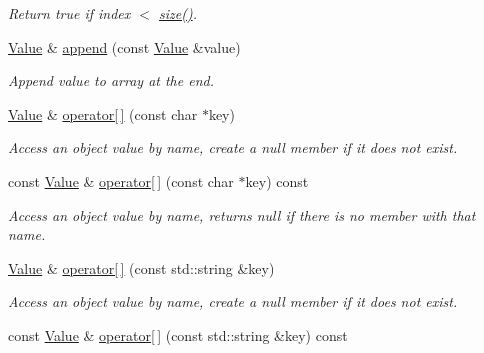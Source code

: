 \begin{DoxyCompactItemize}
\begin{DoxyCompactList}\small\item\em Return true if index $<$ \hyperlink{class_json_1_1_value_a4ca8ee6c48a34ca6c2f131956bab5e05}{size()}. \end{DoxyCompactList}\item 
\hyperlink{class_json_1_1_value}{Value} \& \hyperlink{class_json_1_1_value_a7e49ac977e4bcf59745a09d426669f75}{append} (const \hyperlink{class_json_1_1_value}{Value} \&value)
\begin{DoxyCompactList}\small\item\em Append value to array at the end. \end{DoxyCompactList}\item 
\hypertarget{class_json_1_1_value_acb912f4ec40a25ea6eb387730885f3d9}{\hyperlink{class_json_1_1_value}{Value} \& \hyperlink{class_json_1_1_value_acb912f4ec40a25ea6eb387730885f3d9}{operator\mbox{[}$\,$\mbox{]}} (const char $\ast$key)}\label{class_json_1_1_value_acb912f4ec40a25ea6eb387730885f3d9}

\begin{DoxyCompactList}\small\item\em Access an object value by name, create a null member if it does not exist. \end{DoxyCompactList}\item 
\hypertarget{class_json_1_1_value_ae5f73ffc7a039bca81b7ca771bc5db55}{const \hyperlink{class_json_1_1_value}{Value} \& \hyperlink{class_json_1_1_value_ae5f73ffc7a039bca81b7ca771bc5db55}{operator\mbox{[}$\,$\mbox{]}} (const char $\ast$key) const }\label{class_json_1_1_value_ae5f73ffc7a039bca81b7ca771bc5db55}

\begin{DoxyCompactList}\small\item\em Access an object value by name, returns null if there is no member with that name. \end{DoxyCompactList}\item 
\hypertarget{class_json_1_1_value_ae511c7d46bf457412fb55c9471af9f50}{\hyperlink{class_json_1_1_value}{Value} \& \hyperlink{class_json_1_1_value_ae511c7d46bf457412fb55c9471af9f50}{operator\mbox{[}$\,$\mbox{]}} (const std\-::string \&key)}\label{class_json_1_1_value_ae511c7d46bf457412fb55c9471af9f50}

\begin{DoxyCompactList}\small\item\em Access an object value by name, create a null member if it does not exist. \end{DoxyCompactList}\item 
\hypertarget{class_json_1_1_value_ac14123afaf12d953aad75ec2610fbb85}{const \hyperlink{class_json_1_1_value}{Value} \& \hyperlink{class_json_1_1_value_ac14123afaf12d953aad75ec2610fbb85}{operator\mbox{[}$\,$\mbox{]}} (const std\-::string \&key) const }\label{class_json_1_1_value_ac14123afaf12d953aad75ec2610fbb85}


\end{DoxyCompactItemize}
